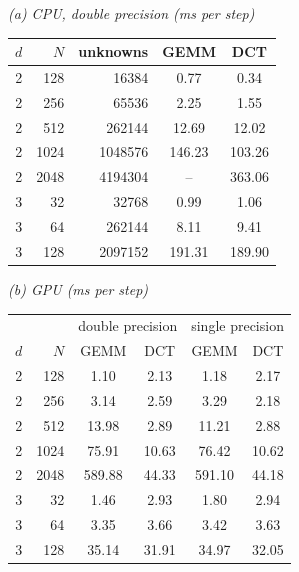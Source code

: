 \textit{(a) CPU, double precision (ms per step)}\\[2pt]
\begin{tabular}{rr r cc}
\toprule
$d$ & $N$ & unknowns & GEMM & DCT\\
\midrule
2 & 128 & 16384 & 0.77 & 0.34\\
2 & 256 & 65536 & 2.25 & 1.55\\
2 & 512 & 262144 & 12.69 & 12.02\\
2 & 1024 & 1048576 & 146.23 & 103.26\\
2 & 2048 & 4194304 & -- & 363.06\\
3 & 32 & 32768 & 0.99 & 1.06\\
3 & 64 & 262144 & 8.11 & 9.41\\
3 & 128 & 2097152 & 191.31 & 189.90\\
\bottomrule
\end{tabular}

\medskip
\textit{(b) GPU (ms per step)}\\[2pt]
\begin{tabular}{rr cc cc}
\toprule
& & \multicolumn{2}{c}{double precision} & \multicolumn{2}{c}{single precision}\\
$d$ & $N$ & GEMM & DCT & GEMM & DCT\\
\midrule
2 & 128 & 1.10 & 2.13 & 1.18 & 2.17\\
2 & 256 & 3.14 & 2.59 & 3.29 & 2.18\\
2 & 512 & 13.98 & 2.89 & 11.21 & 2.88\\
2 & 1024 & 75.91 & 10.63 & 76.42 & 10.62\\
2 & 2048 & 589.88 & 44.33 & 591.10 & 44.18\\
3 & 32 & 1.46 & 2.93 & 1.80 & 2.94\\
3 & 64 & 3.35 & 3.66 & 3.42 & 3.63\\
3 & 128 & 35.14 & 31.91 & 34.97 & 32.05\\
\bottomrule
\end{tabular}
